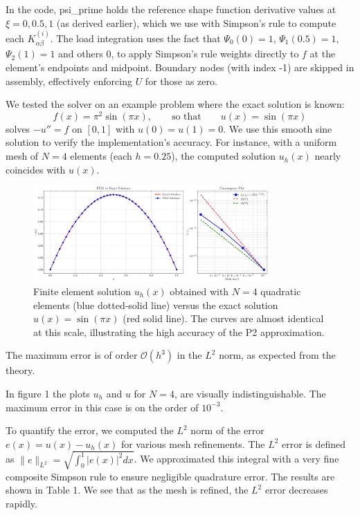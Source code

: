 \documentclass[a4paper,10pt]{article}
\begin{document}
In the code, psi\_prime holds the reference shape function derivative values at $\xi=0,0.5,1$ (as derived earlier), which we use with Simpson's rule to compute each $K^{(i)}_{\alpha\beta}$.
The load integration uses the fact that $\Psi_0(0)=1$, $\Psi_1(0.5)=1$, $\Psi_2(1)=1$ and others 0, to apply Simpson's rule weights directly to $f$ at the element's endpoints and midpoint.
Boundary nodes (with index -1) are skipped in assembly, effectively enforcing $U$ for those as zero.

We tested the solver on an example problem where the exact solution is known:
$$ f(x) = \pi^2 \sin(\pi x), \qquad \text{so that}\qquad u(x) = \sin(\pi x) $$
solves $-u''=f$ on $[0,1]$ with $u(0)=u(1)=0$.
We use this smooth sine solution to verify the implementation's accuracy.
For instance, with a uniform mesh of $N=4$ elements (each $h=0.25$), the computed solution $u_h(x)$ nearly coincides with $u(x)$.
\begin{figure}[H]
	\centering
	\includegraphics[width=0.8\textwidth]{figures/fem_solution_20_1.png}
	\caption{Finite element solution $u_h(x)$ obtained with $N=4$ quadratic elements (blue dotted-solid line) versus the exact solution $u(x)=\sin(\pi x)$ (red solid line).
		The curves are almost identical at this scale, illustrating the high accuracy of the P2 approximation.}
\end{figure}
The maximum error is of order \(\mathcal{O}(h^3)\) in the \(L^2\) norm, as expected from the theory.

In figure 1 the plots $u_h$ and $u$ for $N=4$, are visually indistinguishable.
The maximum error in this case is on the order of $10^{-3}$.

To quantify the error, we computed the $L^2$ norm of the error $e(x)=u(x)-u_h(x)$ for various mesh refinements. The $L^2$ error is defined as $\|e\|_{L^2} = \sqrt{\int_0^1 |e(x)|^2 dx}$. We approximated this integral with a very fine composite Simpson rule to ensure negligible quadrature error. The results are shown in Table 1. We see that as the mesh is refined, the $L^2$ error decreases rapidly.
\end{document}
